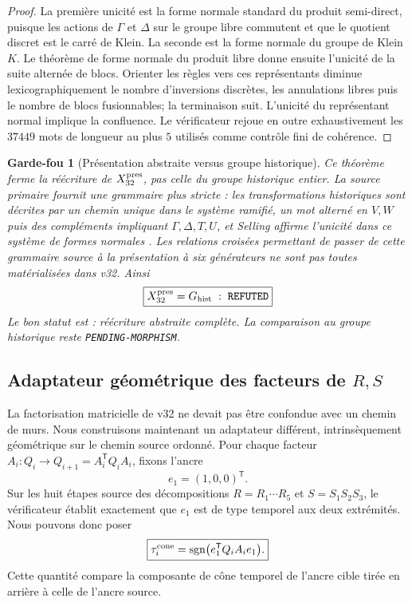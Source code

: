 \documentclass[11pt,a4paper]{article}
\newtheorem{guardrail}[theorem]{Garde-fou}
\newcommand{\certRefuted}{\texttt{REFUTED}}
\newcommand{\certPending}{\texttt{PENDING-MORPHISM}}
\begin{document}
\begin{proof}
La première unicité est la forme normale standard du produit semi-direct, puisque les actions de
$\Gamma$ et $\Delta$ sur le groupe libre commutent et que le quotient discret est le carré de Klein.
La seconde est la forme normale du groupe de Klein $K$. Le théorème de forme normale du produit
libre donne ensuite l'unicité de la suite alternée de blocs. Orienter les règles vers ces représentants
diminue lexicographiquement le nombre d'inversions discrètes, les annulations libres puis le nombre
de blocs fusionnables; la terminaison suit. L'unicité du représentant normal implique la confluence.
Le vérificateur rejoue en outre exhaustivement les $37449$ mots de longueur au plus $5$ utilisés
comme contrôle fini de cohérence.
\end{proof}

\begin{guardrail}[Présentation abstraite versus groupe historique]
Ce théorème ferme la réécriture de \emph{$X_{32}^{\rm pres}$}, pas celle du groupe historique entier.
La source primaire fournit une grammaire plus stricte : les transformations historiques sont décrites
par un chemin unique dans le système ramifié, un mot alterné en $V,W$ puis des compléments impliquant
$\Gamma,\Delta,T,U$, et Selling affirme l'unicité dans ce système de formes normales
\cite{Selling1877}. Les relations croisées permettant de passer de cette grammaire source à la
présentation à six générateurs ne sont pas toutes matérialisées dans v32. Ainsi
\[
 \boxed{X_{32}^{\rm pres}=G_{\rm hist}\;:\;\certRefuted{}}
\]
Le bon statut est : réécriture abstraite complète. La comparaison au groupe historique reste
\certPending{}.
\end{guardrail}

\subsection{Adaptateur géométrique des facteurs de \texorpdfstring{$R,S$}{R,S}}

La factorisation matricielle de v32 ne devait pas être confondue avec un chemin de murs. Nous
construisons maintenant un adaptateur différent, intrinsèquement géométrique sur le chemin source
ordonné. Pour chaque facteur $A_i:Q_i\to Q_{i+1}=A_i^{\mathsf T}Q_iA_i$, fixons l'ancre
\[
 e_1=(1,0,0)^{\mathsf T}.
\]
Sur les huit étapes source des décompositions $R=R_1\cdots R_5$ et $S=S_1S_2S_3$, le vérificateur
établit exactement que $e_1$ est de type temporel aux deux extrémités. Nous pouvons donc poser
\begin{equation}\label{eq:v33-factor-tau}
 \boxed{
 \tau_i^{\rm cone}
 =\operatorname{sgn}
 \bigl(e_1^{\mathsf T}Q_iA_ie_1\bigr).}
\end{equation}
Cette quantité compare la composante de cône temporel de l'ancre cible tirée en arrière à celle de
l'ancre source.
\end{document}
